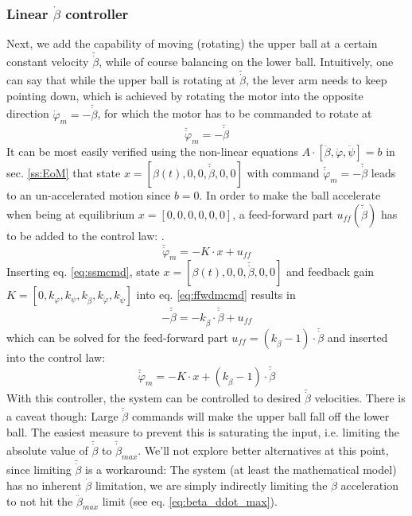 \documentclass{article}
\begin{document}
\subsubsection{Linear \texorpdfstring{$\dot{\beta}$}{betadot} controller}
Next, we add the capability of moving (rotating) the upper ball at a certain constant velocity $\breve{\dot{\beta}}$, while of course balancing on the lower ball.
Intuitively, one can say that while the upper ball is rotating at $\breve{\dot{\beta}}$, the lever arm needs to keep pointing down, which is achieved by rotating the motor into the opposite direction $\dot{\varphi}_m = -\breve{\dot{\beta}}$, for which the motor has to be commanded to rotate at
\begin{equation}
\breve{\dot{\varphi}}_m = -\breve{\dot{\beta}}
\label{eq:ssmcmd}
\end{equation}
It can be most easily verified using the non-linear equations $A \cdot [\ddot{\beta}, \ddot{\varphi}, \ddot{\psi}] = b$ in sec. \ref{ss:EoM} that state $x = [\beta(t), 0, 0, \breve{\dot{\beta}}, 0, 0]$ with command $\breve{\dot{\varphi}}_m = -\breve{\dot{\beta}}$ leads to an un-accelerated motion since $b=0$.
In order to make the ball accelerate when being at equilibrium $x=[0,0,0,0,0,0]$, a feed-forward part $u_{ff} \left( \breve{\dot{\beta}} \right)$ has to be added to the control law: .
\begin{equation}
\breve{\dot{\varphi}}_m=-K \cdot x + u_{ff}
\label{eq:ffwdmcmd}
\end{equation}
Inserting eq. \ref{eq:ssmcmd}, state $x = [\beta(t), 0, 0, \breve{\dot{\beta}}, 0, 0]$ and feedback gain \newline $K = \left[0, k_{\varphi}, k_{\psi}, k_{\dot{\beta}}, k_{\dot{\varphi}}, k_{\dot{\psi}} \right]$ into eq. \ref{eq:ffwdmcmd} results in
\begin{equation}
-\breve{\dot{\beta}} = -k_{\dot{\beta}} \cdot \breve{\dot{\beta}}  + u_{ff}
\end{equation}
which can be solved for the feed-forward part $u_{ff} = (k_{\dot{\beta}} - 1 ) \cdot \breve{\dot{\beta}}$ and inserted into the control law:
\begin{equation}
\breve{\dot{\varphi}}_m=-K \cdot x + \left(k_{\dot{\beta}} - 1 \right) \cdot \breve{\dot{\beta}}
\label{eq:betadotctrl}
\end{equation}
With this controller, the system can be controlled to desired $\breve{\dot{\beta}}$ velocities.
There is a caveat though: Large $\breve{\dot{\beta}}$ commands will make the upper ball fall off the lower ball.
The easiest measure to prevent this is saturating the input, i.e. limiting the absolute value of $\breve{\dot{\beta}}$ to $\breve{\dot{\beta}}_{max}$.
We'll not explore better alternatives at this point, since limiting $\breve{\dot{\beta}}$ is a workaround:
The system (at least the mathematical model) has no inherent $\dot{\beta}$ limitation, we are simply indirectly limiting the $\ddot{\beta}$ acceleration to not hit the $\ddot{\beta}_{max}$ limit (see eq. \ref{eq:beta_ddot_max}).
\end{document}
